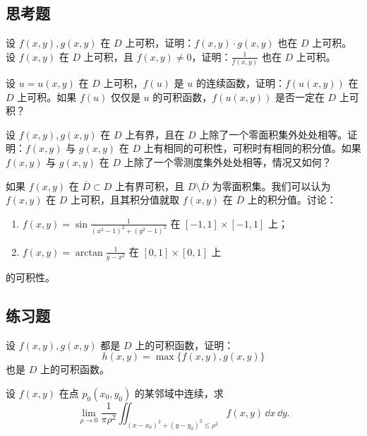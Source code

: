 \subsection{思考题}

\begin{xthought}[1]
设 $f(x,y),g(x,y)$ 在 $D$ 上可积，证明：$f(x,y)\cdot g(x,y)$ 也在 $D$ 上可积。设 $f(x,y)$ 在 $D$ 上可积，且 $f(x,y)\ne0$，证明：$\frac1{f(x,y)}$ 也在 $D$ 上可积。
\end{xthought}

\begin{xthought}[2]
设 $u=u(x,y)$ 在 $D$ 上可积，$f(u)$ 是 $u$ 的连续函数，证明：$f(u(x,y))$ 在 $D$ 上可积。如果 $f(u)$ 仅仅是 $u$ 的可积函数，$f(u(x,y))$ 是否一定在 $D$ 上可积？
\end{xthought}

\begin{xthought}[3]
设 $f(x,y),g(x,y)$ 在 $D$ 上有界，且在 $D$ 上除了一个零面积集外处处相等。证明：$f(x,y)$ 与 $g(x,y)$ 在 $D$ 上有相同的可积性，可积时有相同的积分值。如果 $f(x,y)$ 与 $g(x,y)$ 在 $D$ 上除了一个零测度集外处处相等，情况又如何？
\end{xthought}

\begin{xthought}[4]
如果 $f(x,y)$ 在 $\overline D\subset D$ 上有界可积，且 $D\setminus\overline D$ 为零面积集。我们可以认为 $f(x,y)$ 在 $D$ 上可积，且其积分值就取 $f(x,y)$ 在 $\overline D$ 上的积分值。讨论：
  \begin{enumerate}[label=(\arabic*)]
    \item $\displaystyle f(x,y)=\sin\frac1{(x^2-1)^2+(y^2-1)^2}$ 在 $[-1,1]\times[-1,1]$ 上；
    \item $\displaystyle f(x,y)=\arctan\frac1{y-x^2}$ 在 $[0,1]\times[0,1]$ 上
  \end{enumerate}
  的可积性。
\end{xthought}

\subsection{练习题}

\begin{xexercise}[1]
设 $f(x,y),g(x,y)$ 都是 $D$ 上的可积函数，证明：
  \[
    h(x,y)=\max\{f(x,y),g(x,y)\}
  \]
  也是 $D$ 上的可积函数。
\end{xexercise}

\begin{xexercise}[2]
设 $f(x,y)$ 在点 $p_0(x_0,y_0)$ 的某邻域中连续，求
  \[
    \lim_{\rho\to0}\frac1{\pi\rho^2}
    \iint_{(x-x_0)^2+(y-y_0)^2\le\rho^2}f(x,y)\,\dd x\,\dd y.
  \]
\end{xexercise}

